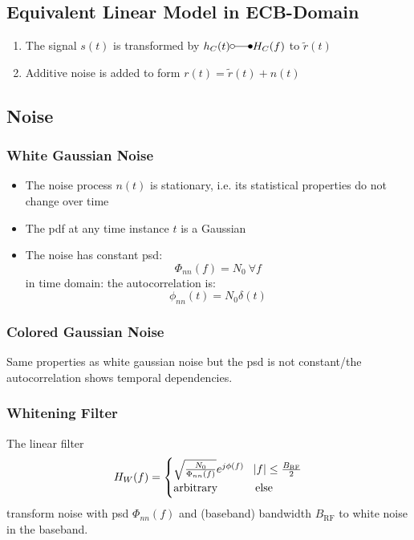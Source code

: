 \subsection{Equivalent Linear Model in ECB-Domain}
\begin{enumerate}
    \item The signal $s(t)$ is transformed by $h_C(t) \laplace H_C(f)$ to $\tilde{r}(t)$
    \item Additive noise is added to form $r(t) = \tilde{r}(t) + n(t)$
\end{enumerate}

\subsection{Noise}
\subsubsection{White Gaussian Noise}
\begin{itemize}
    \item The noise process $n(t)$ is stationary, i.e. its statistical properties
        do not change over time
    \item The \ac{pdf} at any time instance $t$ is a Gaussian
    \item The noise has constant \ac{psd}:
        \begin{equation}
            \Phi_{nn}(f) = N_0\ \forall f
        \end{equation}
        in time domain: the autocorrelation is:
        \begin{equation}
            \phi_{nn}(t) = N_0 \delta(t)
        \end{equation}
\end{itemize} 

\subsubsection{Colored Gaussian Noise}
Same properties as white gaussian noise but the \ac{psd} is not constant/the autocorrelation
shows temporal dependencies.

\subsubsection{Whitening Filter}
The linear filter
\begin{equation}
    H_W(f) =
    \begin{cases}
        \sqrt{\frac{N_0}{\Phi_{nn}(f)}} e^{j \phi(f)} & \abs{f} \leq \frac{B_\text{RF}}{2} \\
        \text{arbitrary} & \text{else}
    \end{cases}
\end{equation}
transform noise with psd $\Phi_{nn}(f)$ and (baseband) bandwidth $B_\text{RF}$ to
white noise in the baseband.

